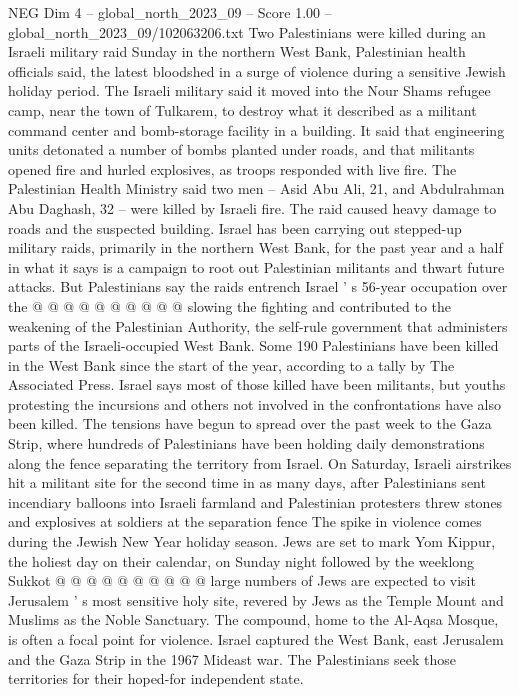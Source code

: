 \begin{textsample}{NEG Dim 4 – global\_north\_2023\_09 – Score 1.00 – global\_north\_2023\_09/102063206.txt}  \label{ex:f4_neg_042}
Two Palestinians were killed during an Israeli military raid Sunday in the northern West Bank, Palestinian health officials said, the latest bloodshed in a surge of violence during a sensitive Jewish holiday period.
The Israeli military said it moved into the Nour Shams refugee camp, near the town of Tulkarem, to destroy what it described as a militant command center and bomb-storage facility in a building.
It said that engineering units detonated a number of bombs planted under roads, and that militants opened fire and hurled explosives, as troops responded with live fire.
The Palestinian Health Ministry said two men -- Asid Abu Ali, 21, and Abdulrahman Abu Daghash, 32 -- were killed by Israeli fire.
The raid caused heavy damage to roads and the suspected building.
Israel has been carrying out stepped-up military raids, primarily in the northern West Bank, for the past year and a half in what it says is a campaign to root out Palestinian militants and thwart future attacks.
But Palestinians say the raids entrench Israel ' s 56-year occupation over the @ @ @ @ @ @ @ @ @ @ slowing the fighting and contributed to the weakening of the Palestinian Authority, the self-rule government that administers parts of the Israeli-occupied West Bank.
Some 190 Palestinians have been killed in the West Bank since the start of the year, according to a tally by The Associated Press.
Israel says most of those killed have been militants, but youths protesting the incursions and others not involved in the confrontations have also been killed.
The tensions have begun to spread over the past week to the Gaza Strip, where hundreds of Palestinians have been holding daily demonstrations along the fence separating the territory from Israel.
On Saturday, Israeli airstrikes hit a militant site for the second time in as many days, after Palestinians sent incendiary balloons into Israeli farmland and Palestinian protesters threw stones and explosives at soldiers at the separation fence The spike in violence comes during the Jewish New Year holiday season.
Jews are set to mark Yom Kippur, the holiest day on their calendar, on Sunday night followed by the weeklong Sukkot @ @ @ @ @ @ @ @ @ @ large numbers of Jews are expected to visit Jerusalem ' s most sensitive holy site, revered by Jews as the Temple Mount and Muslims as the Noble Sanctuary.
The compound, home to the Al-Aqsa Mosque, is often a focal point for violence.
Israel captured the West Bank, east Jerusalem and the Gaza Strip in the 1967 Mideast war.
The Palestinians seek those territories for their hoped-for independent state.

\end{textsample}
